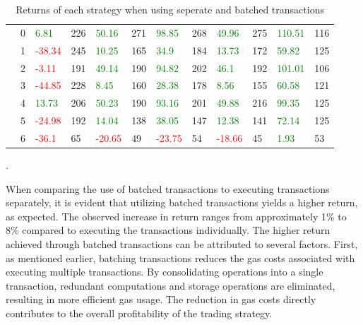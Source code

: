 \begin{table}[H]
\begin{adjustwidth}{-0.8in}{-0.9in}
\begin{tabular}{|p{2em}|p{2em}|p{3em}|p{3em}|p{3em}|p{3em}|p{3em}|p{3em}|p{3em}|p{3em}|p{3em}|p{3em}|}
            \parbox[t]{4em}{} & 0 & \textcolor{green}{6.81} & 226 & \textcolor{green}{50.16} & 271 & \textcolor{green}{98.85} & 268 & \textcolor{green}{49.96} & 275 & \textcolor{green}{110.51} & 116\\
            & 1 & \textcolor{red}{-38.34} & 245 & \textcolor{green}{10.25} & 165 & \textcolor{green}{34.9} & 184 & \textcolor{green}{13.73} & 172 & \textcolor{green}{59.82} & 125\\
            & 2 & \textcolor{red}{-3.11} & 191 & \textcolor{green}{49.14} & 190 & \textcolor{green}{94.82} & 202 & \textcolor{green}{46.1} & 192 & \textcolor{green}{101.01} & 106\\
            & 3 & \textcolor{red}{-44.85} & 228 & \textcolor{green}{8.45} & 160 & \textcolor{green}{28.38} & 178 & \textcolor{green}{8.56} & 155 & \textcolor{green}{60.58} & 121\\
            & 4 & \textcolor{green}{13.73} & 206 & \textcolor{green}{50.23} & 190 & \textcolor{green}{93.16} & 201 & \textcolor{green}{49.88} & 216 & \textcolor{green}{99.35} & 125\\
            & 5 & \textcolor{red}{-24.98} & 192 & \textcolor{green}{14.04} & 138 & \textcolor{green}{38.05} & 147 & \textcolor{green}{12.38} & 141 & \textcolor{green}{72.14} & 125\\
            & 6 & \textcolor{red}{-36.1} & 65 & \textcolor{red}{-20.65} & 49 & \textcolor{red}{-23.75} & 54 & \textcolor{red}{-18.66} & 45 & \textcolor{green}{1.93} & 53\\\hline
        \end{tabular}
    \end{adjustwidth}
    \caption{Returns of each strategy when using seperate and batched transactions \label{tab:BatchedVsSeperate}}.
\end{table}
\noindent When comparing the use of batched transactions to executing transactions separately, it is evident that utilizing batched transactions yields a higher return, as expected. The observed increase in return ranges from approximately 1\% to 8\% compared to executing the transactions individually. The higher return achieved through batched transactions can be attributed to several factors. First, as mentioned earlier, batching transactions reduces the gas costs associated with executing multiple transactions. By consolidating operations into a single transaction, redundant computations and storage operations are eliminated, resulting in more efficient gas usage. The reduction in gas costs directly contributes to the overall profitability of the trading strategy.

